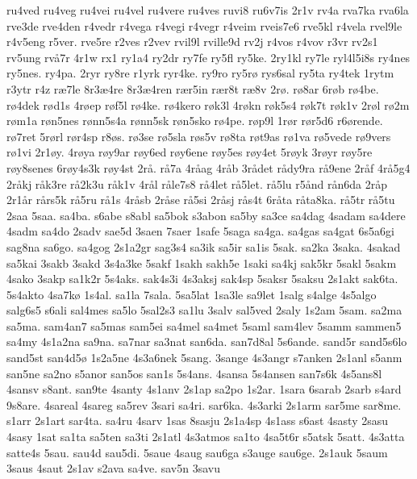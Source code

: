 {ru4ved
ru4veg
ru4vei
ru4vel
ru4vere
ru4ves
ruvi8
ru6v7is
2r1v
rv4a
rva7ka
rva6la
rve3de
rve4den
r4vedr
r4vega
r4vegi
r4vegr
r4veim
rveis7e6
rve5kl
r4vela
rvel9le
r4v5eng
r5ver.
rve5re
r2ves
r2vev
rvil9l
rville9d
rv2j
r4vos
r4vov
r3vr
rv2s1
rv5ung
rv^^e57r
4r1w
rx1
ry1a4
ry2dr
ry7fe
ry5fl
ry5ke.
2ry1kl
ry7le
ryl4l5i8s
ry4nes
ry5nes.
ry4pa.
2ryr
ry8re
r1yrk
ryr4ke.
ry9ro
ry5r^^f8
rys6sal
ry5ta
ry4tek
1rytm
r3ytr
r4z
r^^e67le
8r3^^e64re
8r3^^e64ren
r^^e6r5in
r^^e6r8t
r^^e68v
2r^^f8.
r^^f88ar
6r^^f8b
r^^f84be.
r^^f84dek
r^^f8d1s
4r^^f8ep
r^^f8f5l
r^^f84ke.
r^^f84kero
r^^f8k3l
4r^^f8kn
r^^f8k5s4
r^^f8k7t
r^^f8k1v
2r^^f8l
r^^f82m
r^^f8m1a
r^^f8n5nes
r^^f8nn5s4a
r^^f8nn5sk
r^^f8n5sko
r^^f84pe.
r^^f8p9l
1r^^f8r
r^^f8r5d6
r6^^f8rende.
r^^f87ret
5r^^f8rl
r^^f8r4sp
r8^^f8s.
r^^f83se
r^^f85sla
r^^f8s5v
r^^f88ta
r^^f8t9as
r^^f81va
r^^f85vede
r^^f89vers
r^^f81vi
2r1^^f8y.
4r^^f8ya
r^^f8y9ar
r^^f8y6ed
r^^f8y6ene
r^^f8y5es
r^^f8y4et
5r^^f8yk
3r^^f8yr
r^^f8y5re
r^^f8y8senes
6r^^f8y4s3k
r^^f8y4st
2r^^e5.
r^^e57a
4r^^e5ag
4r^^e5b
3r^^e5det
r^^e5dy9ra
r^^e59ene
2r^^e5f
4r^^e55g4
2r^^e5kj
r^^e5k3re
r^^e52k3u
r^^e5k1v
4r^^e5l
r^^e5le7s8
r^^e54let
r^^e55let.
r^^e55lu
r5^^e5nd
r^^e5n6da
2r^^e5p
2r1^^e5r
r^^e5rs5k
r^^e55ru
r^^e51s
4r^^e5sb
2r^^e5se
r^^e55si
2r^^e5sj
r^^e5s4t
6r^^e5ta
r^^e5ta8ka.
r^^e55tr
r^^e55tu
2saa
5saa.
sa4ba.
s6abe
s8abl
sa5bok
s3abon
sa5by
sa3ce
sa4dag
4sadam
sa4dere
4sadm
sa4do
2sadv
sae5d
3saen
7saer
1safe
5saga
sa4ga.
sa4gas
sa4gat
6s5a6gi
sag8na
sa6go.
sa4gog
2s1a2gr
sag3s4
sa3ik
sa5ir
sa1is
5sak.
sa2ka
3saka.
4sakad
sa5kai
3sakb
3sakd
3s4a3ke
5sakf
1sakh
sakh5e
1saki
sa4kj
sak5kr
5sakl
5sakm
4sako
3sakp
sa1k2r
5s4aks.
sak4s3i
4s3aksj
sak4sp
5saksr
5saksu
2s1akt
sak6ta.
5s4akto
4sa7k^^f8
1s4al.
sa1la
7sala.
5sa5lat
1sa3le
sa9let
1salg
s4alge
4s5algo
salg6s5
s6ali
sal4mes
sa5lo
5sal2s3
sa1lu
3salv
sal5ved
2saly
1s2am
5sam.
sa2ma
sa5ma.
sam4an7
sa5mas
sam5ei
sa4mel
sa4met
5saml
sam4lev
5samm
sammen5
sa4my
4s1a2na
sa9na.
sa7nar
sa3nat
san6da.
san7d8al
5s6ande.
sand5r
sand5s6lo
sand5st
san4d5^^f8
1s2a5ne
4s3a6nek
5sang.
3sange
4s3angr
s7anken
2s1anl
s5anm
san5ne
sa2no
s5anor
san5os
san1s
5s4ans.
4sansa
5s4ansen
san7s6k
4s5ans8l
4sansv
s8ant.
san9te
4santy
4s1anv
2s1ap
sa2po
1s2ar.
1sara
6sarab
2sarb
s4ard
9s8are.
4sareal
4sareg
sa5rev
3sari
sa4ri.
sar6ka.
4s3arki
2s1arm
sar5me
sar8me.
s1arr
2s1art
sar4ta.
sa4ru
4sarv
1sas
8sasju
2s1a4sp
4s1ass
s6ast
4sasty
2sasu
4sasy
1sat
sa1ta
sa5ten
sa3ti
2s1atl
4s3atmos
sa1to
4sa5t6r
s5atsk
5satt.
4s3atta
satte4s
5sau.
sau4d
sau5di.
5saue
4saug
sau6ga
s3auge
sau6ge.
2s1auk
5saum
3saus
4saut
2s1av
s2ava
sa4ve.
sav5n
3savu
}
